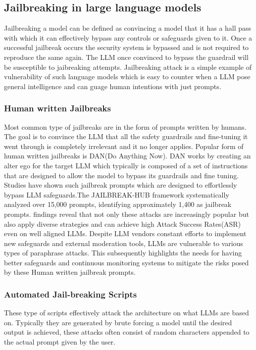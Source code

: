 \documentclass[pdflatex,sn-mathphys-num]{sn-jnl}%
\theoremstyle{thmstyleone}%
\theoremstyle{thmstyletwo}%
\theoremstyle{thmstylethree}%
\begin{document}
\subsection{Jailbreaking in large language models}\label{subsec2}
Jailbreaking a model can be defined as convincing a model that it has a hall pass with which it can effectively bypass any controls or safeguards given to it\cite{jailbreaking2024}. Once a successful jailbreak occurs the security system is bypassed and is not required to reproduce the same again. The LLM once convinced to bypass the guardrail will be susceptible to jaibreaking attempts. Jailbreaking attack is a simple example of vulnerability of such language models which is easy to counter when a LLM pose general intelligence and can guage human intentions with just prompts.


\subsubsection{Human written Jailbreaks}\label{subsubsubsec2}
Most common type of jailbreaks are in the form of prompts written by humans. The goal is to convince the LLM that all the safety guardrails and fine-tuning it went through is completely irrelevant and it no longer applies. Popular form of human written jailbreaks is DAN(Do Anything Now). DAN works by creating an alter ego for the target LLM which typically is composed of a set of instructions that are designed to allow the model to bypass its guardrails and fine tuning. Studies have shown such jailbreak prompts which are designed to effortlessly bypass LLM safeguards\cite{shen2024donowcharacterizingevaluating}.The JAILBREAK-HUB framework systematically analyzed over 15,000 prompts, identifying approximately 1,400 as jailbreak prompts. findings reveal that not only these attacks are increasingly popular but also apply diverse strategies and can achieve high Attack Success Rates(ASR) even on well aligned LLMs. Despite LLM vendors constant efforts to implement new safeguards and external moderation tools, LLMs are vulnerable to various types of paraphrase attacks. This subsequently highlights the needs for having better safeguards and continuous monitoring systems to mitigate the risks posed by these Human written jailbreak prompts.
   

\subsubsection{Automated Jail-breaking Scripts}\label{subsubsubsec2} 
These type of scripts effectively attack the architecture on what LLMs are based on. Typically they are generated by brute forcing a model until the desired output is achieved, these attacks often consist of random characters appended to the actual prompt given by the user.
\end{document}
